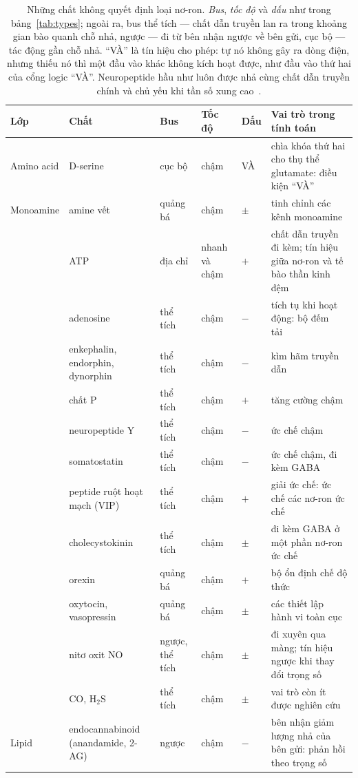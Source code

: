 \begin{table}[t]
\centering
\footnotesize
\setlength{\tabcolsep}{4pt}
\renewcommand{\arraystretch}{1.12}
\begin{tabular}{>{\raggedright}p{2.25cm}>{\raggedright}p{2.8cm}>{\raggedright}p{1.8cm}>{\raggedright}p{1.5cm}>{\centering}p{0.8cm}>{\raggedright\arraybackslash}p{4.3cm}}
\toprule
Lớp & Chất & Bus & Tốc độ & Dấu & Vai trò trong tính toán \\
\midrule
Amino acid & D-serine & cục bộ & chậm & VÀ & chìa khóa thứ hai cho thụ thể glutamate: điều kiện ``VÀ'' \\
\midrule
Monoamine & amine vết & quảng bá & chậm & $\pm$ & tinh chỉnh các kênh monoamine \\
\midrule
\multirow{2}{2.25cm}{Purine}
 & ATP & địa chỉ & nhanh và chậm & $+$ & chất dẫn truyền đi kèm; tín hiệu giữa nơ-ron và tế bào thần kinh đệm \\
 & adenosine & thể tích & chậm & $-$ & tích tụ khi hoạt động: bộ đếm tải~\cite{Dunwiddie2001} \\
\midrule
\multirow{8}{2.25cm}{Neuropeptide (hơn một trăm)}
 & enkephalin, endorphin, dynorphin & thể tích & chậm & $-$ & kìm hãm truyền dẫn \\
 & chất P & thể tích & chậm & $+$ & tăng cường chậm \\
 & neuropeptide Y & thể tích & chậm & $-$ & ức chế chậm \\
 & somatostatin & thể tích & chậm & $-$ & ức chế chậm, đi kèm GABA \\
 & peptide ruột hoạt mạch (VIP) & thể tích & chậm & $+$ & giải ức chế: ức chế các nơ-ron ức chế \\
 & cholecystokinin & thể tích & chậm & $\pm$ & đi kèm GABA ở một phần nơ-ron ức chế \\
 & orexin & quảng bá & chậm & $+$ & bộ ổn định chế độ thức \\
 & oxytocin, vasopressin & quảng bá & chậm & $\pm$ & các thiết lập hành vi toàn cục \\
\midrule
\multirow{2}{2.25cm}{Khí}
 & nitơ oxit NO & ngược, thể tích & chậm & $\pm$ & đi xuyên qua màng; tín hiệu ngược khi thay đổi trọng số~\cite{Garthwaite2008} \\
 & CO, H$_2$S & thể tích & chậm & $\pm$ & vai trò còn ít được nghiên cứu \\
\midrule
Lipid & endocannabinoid (anandamide, 2-AG) & ngược & chậm & $-$ & bên nhận giảm lượng nhả của bên gửi: phản hồi theo trọng số~\cite{WilsonNicoll2001} \\
\bottomrule
\end{tabular}
\caption{Những chất không quyết định loại nơ-ron. \emph{Bus}, \emph{tốc độ} và \emph{dấu} như trong bảng~\ref{tab:types}; ngoài ra, bus thể tích --- chất dẫn truyền lan ra trong khoảng gian bào quanh chỗ nhả, ngược --- đi từ bên nhận ngược về bên gửi, cục bộ --- tác động gần chỗ nhả. ``VÀ'' là tín hiệu cho phép: tự nó không gây ra dòng điện, nhưng thiếu nó thì một đầu vào khác không kích hoạt được, như đầu vào thứ hai của cổng logic ``VÀ''. Neuropeptide hầu như luôn được nhả cùng chất dẫn truyền chính và chủ yếu khi tần số xung cao~\cite{vandenPol2012}.}
\label{tab:othermediators}
\end{table}
